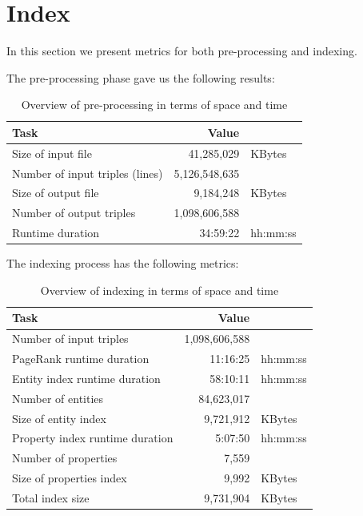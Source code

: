 
\section{Index}

In this section we present metrics for both pre-processing and indexing.

The pre-processing phase gave us the following results:

\begin{table}[h!]
\centering
\begin{tabular}{lrl}
Task                                    & Value  &                    \\
\hline
Size of input file                      & 41,285,029 & KBytes       \\
Number of input triples (lines)         & 5,126,548,635  &            \\
Size of output file                     & 9,184,248 & KBytes        \\
Number of output triples                & 1,098,606,588 &             \\
Runtime duration                        & 34:59:22  & hh:mm:ss        \\
\end{tabular}
\caption{Overview of pre-processing in terms of space and time}
\label{table:preprocessingMetrics}
\end{table}

The indexing process has the following metrics:

\begin{table}[h!]
\centering
\begin{tabular}{lrl}
Task                                    & Value  &                    \\
\hline
Number of input triples                 & 1,098,606,588 &             \\
PageRank runtime duration               & 11:16:25 & hh:mm:ss        \\
Entity index runtime duration           & 58:10:11 & hh:mm:ss       \\
Number of entities                      & 84,623,017 &                \\
Size of entity index                    & 9,721,912 & KBytes         \\
Property index runtime duration         & 5:07:50 & hh:mm:ss       \\
Number of properties                    & 7,559 &                     \\
Size of properties index                & 9,992 & KBytes             \\
Total index size                        & 9,731,904 & KBytes         \\
\end{tabular}
\caption{Overview of indexing in terms of space and time}
\label{table:indexMetrics}
\end{table}

